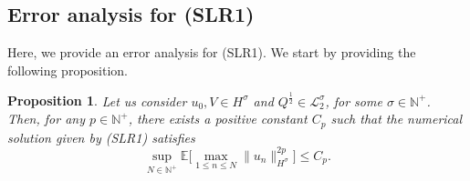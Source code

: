 \documentclass[a4paper]{amsart}
\newtheorem{proposition}[theorem]{Proposition}
\begin{document}
\subsection{Error analysis for (SLR1)}
\label{sec_lr}
Here, we provide an error analysis for (SLR1). We start by providing the following proposition.
\begin{proposition}
\label{prop_stab_lin}
    Let us consider $u_0, V\in H^{\sigma}$ and $Q^{\frac{1}{2}}\in\mathcal{L}_2^\sigma$, for some $\sigma\in\mathbb{N}^+$. Then, for any $p\in\mathbb{N}^+$, there exists a positive constant $C_p$ such that the numerical solution given by (SLR1) satisfies
    \begin{equation*}
    \sup_{N\in\mathbb{N}^+}\mathbb{E}\big[\max_{1\le n\le N}\|u_n\|^{2p}_{H^\sigma}\big]\le C_p.
    \end{equation*}
\end{proposition}
\end{document}
